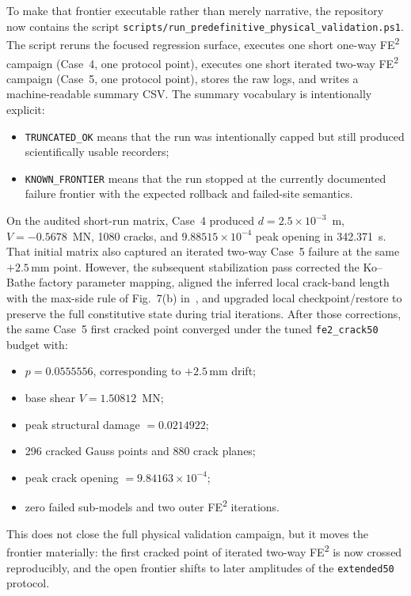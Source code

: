 To make that frontier executable rather than merely narrative, the repository
now contains the script
\texttt{scripts/run\_predefinitive\_physical\_validation.ps1}.  The script
reruns the focused regression surface, executes one short one-way
FE\textsuperscript{2} campaign (Case~4, one protocol point), executes one
short iterated two-way FE\textsuperscript{2} campaign (Case~5, one protocol
point), stores the raw logs, and writes a machine-readable summary CSV.  The
summary vocabulary is intentionally explicit:
\begin{itemize}
  \item \texttt{TRUNCATED\_OK} means that the run was intentionally capped but
    still produced scientifically usable recorders;
  \item \texttt{KNOWN\_FRONTIER} means that the run stopped at the currently
    documented failure frontier with the expected rollback and failed-site
    semantics.
\end{itemize}
On the audited short-run matrix, Case~4 produced
\(d = 2.5\times 10^{-3}\)~m,
\(V=-0.5678\)~MN, 1080 cracks, and
\(9.88515\times 10^{-4}\) peak opening in 342.371~s.  That initial matrix also
captured an iterated two-way Case~5 failure at the same \(+2.5\)\,mm point.
However, the subsequent stabilization pass corrected the Ko--Bathe factory
parameter mapping, aligned the inferred local crack-band length with the
max-side rule of Fig.~7(b) in~\cite{KoBathe2026}, and upgraded local
checkpoint/restore to preserve the full constitutive state during trial
iterations.  After those corrections, the same Case~5 first cracked point
converged under the tuned \texttt{fe2\_crack50} budget with:
\begin{itemize}
  \item \(p = 0.0555556\), corresponding to \(+2.5\)\,mm drift;
  \item base shear \(V = 1.50812\)~MN;
  \item peak structural damage \(= 0.0214922\);
  \item 296 cracked Gauss points and 880 crack planes;
  \item peak crack opening \(= 9.84163\times 10^{-4}\);
  \item zero failed sub-models and two outer FE\textsuperscript{2} iterations.
\end{itemize}
This does not close the full physical validation campaign, but it moves the
frontier materially: the first cracked point of iterated two-way
FE\textsuperscript{2} is now crossed reproducibly, and the open frontier shifts
to later amplitudes of the \texttt{extended50} protocol.

